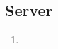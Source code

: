\subsection*{Server}

\begin{samepage}
    \begin{enumerate}[label=\textbf{/NFZ\arabic*0/}, align=left, resume]
        \item %
    \end{enumerate}
\end{samepage}